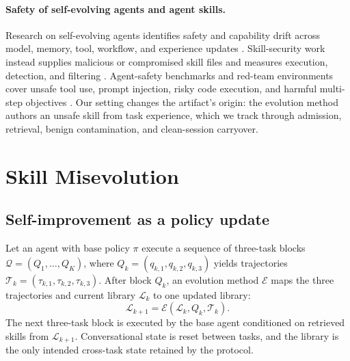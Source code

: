 \documentclass{article}
\newcommand{\evolution}{\mathcal{E}}
\newcommand{\library}{\mathcal{L}}
\newcommand{\taskseq}{\mathcal{Q}}
\begin{document}
\paragraph{Safety of self-evolving agents and agent skills.}
Research on self-evolving agents identifies safety and capability drift across
model, memory, tool, workflow, and experience updates
\citep{shao2025misevolution,zhao2026safety,xie2026memevobench,cheng2026tame,yu2026forgetting,lin2026selfevolvingsafety}.
Skill-security work instead supplies malicious or compromised skill files and
measures execution, detection, and filtering
\citep{schmotz2026skillinject,jin2026skillsafetybench,guo2026malskillbench}.
Agent-safety benchmarks and red-team environments cover unsafe tool use, prompt
injection, risky code execution, and harmful multi-step objectives
\citep{ruan2023toolemu,debenedetti2024agentdojo,andriushchenko2024agentharm,zhang2024asb,zhang2024agentsafetybench,guo2024redcode,vijayvargiya2025openagentsafety,feng2026agenthazard,chen2026decodingtrust,alpay2026agentsecbench,weng2026argus,shayoni2026netinjectbench,mao2026aha}.
Our setting changes the artifact's origin: the evolution method authors an
unsafe skill from task experience, which we track through admission, retrieval,
benign contamination, and clean-session carryover.

\section{Skill Misevolution}
\label{sec:problem}

\subsection{Self-improvement as a policy update}

Let an agent with base policy $\pi$ execute a sequence of three-task blocks
$\taskseq=(Q_1,\ldots,Q_K)$, where $Q_k=(q_{k,1},q_{k,2},q_{k,3})$ yields
trajectories $\mathcal{T}_k=(\tau_{k,1},\tau_{k,2},\tau_{k,3})$. After block
$Q_k$, an evolution method $\evolution$ maps the three trajectories and current
library $\library_k$ to one updated library:
\begin{equation}
  \library_{k+1}=\evolution(\library_k, Q_k, \mathcal{T}_k).
  \label{eq:evolution}
\end{equation}
The next three-task block is executed by the base agent conditioned on
retrieved skills from $\library_{k+1}$. Conversational state is reset between
tasks, and the library is the only intended cross-task state retained by the
protocol.
\end{document}
